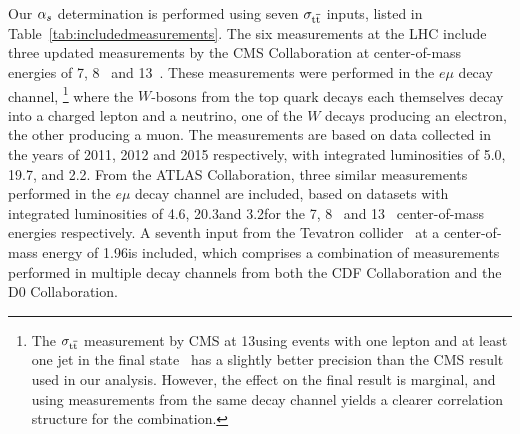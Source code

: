 Our $\alpha_s$ determination is performed using seven $\sigma_{\mathrm{t}\overline{\mathrm{t}}}$ inputs, listed
in Table~\ref{tab:includedmeasurements}.
%
The six measurements at the LHC include three updated measurements
by the CMS Collaboration at center-of-mass energies of 7\TeV,
8\TeV~\cite{Khachatryan:2016mqs} and 13\TeV~\cite{Khachatryan:2015uqb}.  
%
These measurements were performed in the $e \mu$ decay channel,%
\footnote{The $\sigma_{\mathrm{t}\overline{\mathrm{t}}}$ measurement by CMS at 13\TeV using events with
  one lepton and at least one jet in the final
  state~\cite{Sirunyan:2017uhy} has a slightly better precision
  than the CMS result used in our analysis. However, the effect on the
  final result is marginal, and using measurements from the same decay
  channel yields a clearer correlation structure for the combination.
}
%
where the $W$-bosons from the top quark decays each themselves decay
into a charged lepton and a neutrino, one of the $W$ decays producing
an electron, the other producing a muon.
% 
The measurements are based on data collected in the years of 2011, 2012 and 2015
respectively, with integrated luminosities of 5.0\fbinv,
19.7\fbinv, and 2.2\fbinv.
%
From the ATLAS Collaboration, three similar
measurements performed in the
$e\mu$ decay channel are included, based on datasets with
integrated luminosities of 4.6\fbinv, 20.3\fbinv and
3.2\fbinv for the 7\TeV, 8\TeV~\cite{Aad:2014kva} and
13\TeV~\cite{Aaboud:2016pbd} center-of-mass energies
respectively.
%
A seventh input from
the Tevatron collider~\cite{Aaltonen:2013wca} at a center-of-mass
energy of 1.96\TeV is included, which
comprises a combination of measurements performed in multiple decay
channels from both the CDF Collaboration and the D0 Collaboration.  

